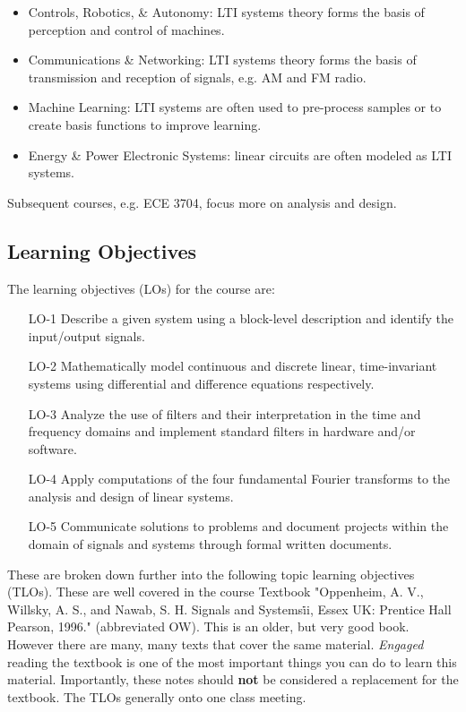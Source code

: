 \begin{itemize}
\item Controls, Robotics, \& Autonomy: LTI systems theory forms the basis of perception and control of machines.
\item Communications \& Networking: LTI systems theory forms the basis of transmission and reception of signals, e.g. AM and FM radio.
\item Machine Learning: LTI systems are often used to pre-process samples or to create basis functions to improve learning.
\item Energy \& Power Electronic Systems: linear circuits are often modeled as LTI systems.
\end{itemize}

Subsequent courses, e.g. ECE 3704, focus more on analysis and design.

\subsection*{Learning Objectives}

The learning objectives (LOs) for the course are:
\begin{enumerate}
\item[LO-1] Describe a given system using a block-level description and identify the input/output signals.
\item[LO-2] Mathematically model continuous and discrete linear, time-invariant systems using differential and difference equations respectively.
\item[LO-3] Analyze the use of filters and their interpretation in the time and frequency domains and implement standard filters in hardware and/or software.
\item[LO-4] Apply computations of the four fundamental Fourier transforms to the analysis and design of linear systems.
\item[LO-5] Communicate solutions to problems and document projects within the domain of signals and systems through formal written documents.
\end{enumerate}

These are broken down further into the following topic learning objectives (TLOs). These are well covered in the course Textbook "Oppenheim, A. V., Willsky, A. S., and Nawab, S. H. Signals and Systems\. ii, Essex UK: Prentice Hall Pearson, 1996." (abbreviated OW). This is an older, but very good book. However there are many, many texts that cover the same material. \textit{Engaged} reading the textbook is one of the most important things you can do to learn this material. Importantly, these notes should \textbf{not} be considered a replacement for the textbook. The TLOs generally onto one class meeting.

